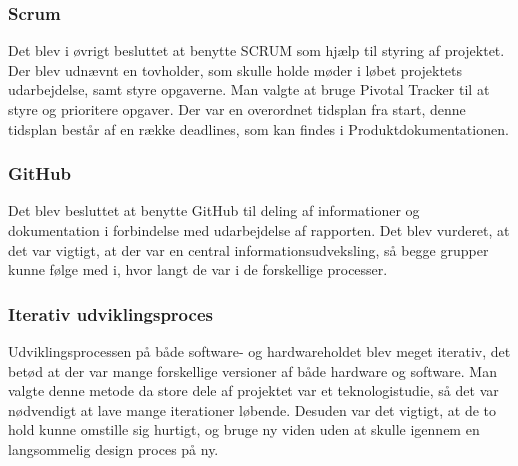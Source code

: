 \subsubsection{Scrum}
Det blev i øvrigt besluttet at benytte SCRUM som hjælp til styring af projektet. Der blev udnævnt en tovholder, som skulle holde møder i løbet projektets udarbejdelse, samt styre opgaverne. Man valgte at bruge Pivotal Tracker \cite{tracker}  til at styre og prioritere opgaver. Der var en overordnet tidsplan fra start, denne tidsplan består af en række deadlines, som kan findes i Produktdokumentationen.
\subsubsection{GitHub}
Det blev besluttet at benytte GitHub til deling af informationer og dokumentation i forbindelse med udarbejdelse af rapporten. Det blev vurderet, at det var vigtigt, at der var en central informationsudveksling, så begge grupper kunne følge med i, hvor langt de var i de forskellige processer. 
\subsubsection{Iterativ udviklingsproces}
Udviklingsprocessen på både software- og hardwareholdet blev meget iterativ, det betød at der var mange forskellige versioner af både hardware og software. Man valgte denne metode da store dele af projektet var et teknologistudie, så det var nødvendigt at lave mange iterationer løbende. Desuden var det vigtigt, at de to hold kunne omstille sig hurtigt, og bruge ny viden uden at skulle igennem en langsommelig design proces på ny.
